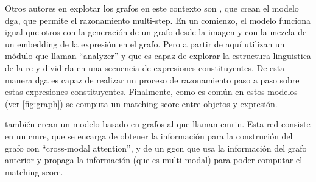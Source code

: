 Otros autores en explotar los grafos en este contexto son
, que crean el modelo \gls{dga}, que permite el
razonamiento multi-step. En un comienzo, el modelo funciona igual que otros con
la generación de un grafo desde la imagen y con la mezcla de un embedding de la
expresión en el grafo. Pero a partir de aquí utilizan un módulo que llaman
``analyzer'' y que es capaz de explorar la estructura linguistica de la
\gls{re} y dividirla en una secuencia de expresiones constituyentes. De esta
manera \gls{dga} es capaz de realizar un proceso de razonamiento paso a paso
sobre estas expresiones constituyentes. Finalmente, como es común en estos
modelos (ver \vref{fig:graph}) se computa un matching score entre objetos y
expresión.

 también crean un
modelo basado en grafos al que llaman \gls{cmrin}. Esta red consiste en un
\gls{cmre}, que se encarga de obtener la información para la construción del
grafo con ``cross-modal attention'', y de un \gls{ggcn} que usa la información
del grafo anterior y propaga la información (que es multi-modal) para poder
computar el matching score.